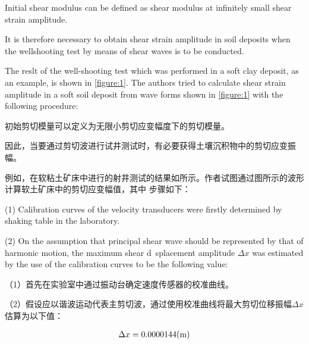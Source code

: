 
\begin{paracol}{2}
    
    Initial shear modulus can be defined as shear modulus at infinitely small shear strain amplitude.
    
    It is therefore necessary to obtain shear strain amplitude in soil deposits when the wellshooting test by means of shear waves is to be conducted.
    
    The reslt of the well-shooting test which was performed in a soft clay deposit, as an example, is shown in \autoref{figure:1}. The authors tried to calculate shear strain amplitude in a soft soil deposit from wave forms shown in \autoref{figure:1} with the following procedure: 

    \switchcolumn

    初始剪切模量可以定义为无限小剪切应变幅度下的剪切模量。
    
    因此，当要通过剪切波进行试井测试时，有必要获得土壤沉积物中的剪切应变振幅。
            
    例如，在软粘土矿床中进行的射井测试的结果如所示。作者试图通过图所示的波形计算软土矿床中的剪切应变幅值，其中 步骤如下：

\end{paracol}



\begin{paracol}{2}
    
    (1) Calibration curves of the velocity transducers were firstly determined by shaking table in the laboratory.
    
    (2) On the assumption that principal shear wave should be represented by that of harmonic motion, the maximum shear d~splacement amplitude $\Delta{}x$ was estimated by the use of the calibration curves to be the following value:

    \switchcolumn
    
    （1）首先在实验室中通过振动台确定速度传感器的校准曲线。
            
    （2）假设应以谐波运动代表主剪切波，通过使用校准曲线将最大剪切位移振幅$\Delta{}x$估算为以下值：

\end{paracol}

\begin{align}
    \Delta{}x=0.0000144(\rm{m})
    \label{equation:2}
\end{align}

